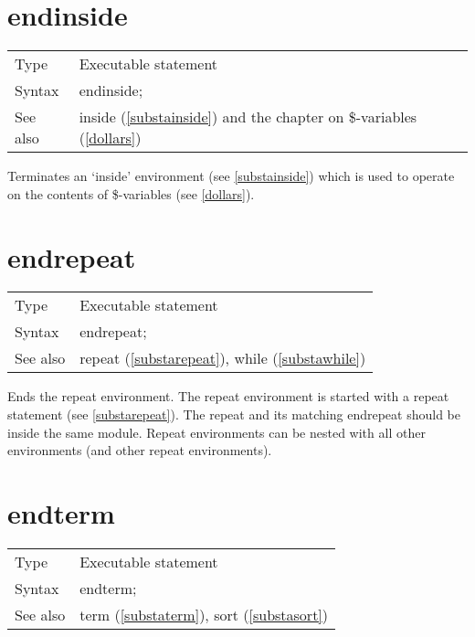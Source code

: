 
\section{endinside}
\label{substaendinside}

\noindent \begin{tabular}{ll}
Type & Executable statement\\
Syntax & endinside;
\\ See also & inside (\ref{substainside}) and the chapter on \$-variables 
(\ref{dollars})
\end{tabular}\vspace{4mm}

\noindent Terminates an `inside' 
environment (see \ref{substainside}) which is 
used to operate on the contents of \$-variables (see 
\ref{dollars}).\vspace{10mm}


\section{endrepeat}
\label{substaendrepeat}

\noindent \begin{tabular}{ll}
Type & Executable statement\\
Syntax & endrepeat;
\\ See also & repeat (\ref{substarepeat}), while (\ref{substawhile})
\end{tabular} \vspace{4mm}

\noindent Ends the repeat 
environment. The repeat environment is started 
with a repeat statement (see \ref{substarepeat}). The repeat and its 
matching endrepeat should be inside the same module. 
Repeat environments can be nested with all other environments (and other 
repeat environments). \vspace{10mm}


\section{endterm}
\label{substaendterm}

\noindent \begin{tabular}{ll}
Type & Executable statement\\
Syntax & endterm;
\\ See also & term (\ref{substaterm}), sort (\ref{substasort})
\end{tabular} \vspace{4mm}

